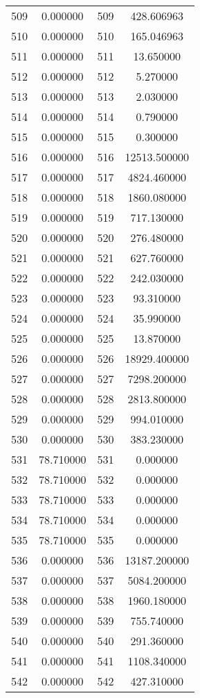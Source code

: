 \documentclass[12pt]{article}
\begin{document}
\begin{longtable}{@{}cccc@{}}
509 & 0.000000 & 509 & 428.606963 \\
510 & 0.000000 & 510 & 165.046963 \\
511 & 0.000000 & 511 & 13.650000 \\
512 & 0.000000 & 512 & 5.270000 \\
513 & 0.000000 & 513 & 2.030000 \\
514 & 0.000000 & 514 & 0.790000 \\
515 & 0.000000 & 515 & 0.300000 \\
516 & 0.000000 & 516 & 12513.500000 \\
517 & 0.000000 & 517 & 4824.460000 \\
518 & 0.000000 & 518 & 1860.080000 \\
519 & 0.000000 & 519 & 717.130000 \\
520 & 0.000000 & 520 & 276.480000 \\
521 & 0.000000 & 521 & 627.760000 \\
522 & 0.000000 & 522 & 242.030000 \\
523 & 0.000000 & 523 & 93.310000 \\
524 & 0.000000 & 524 & 35.990000 \\
525 & 0.000000 & 525 & 13.870000 \\
526 & 0.000000 & 526 & 18929.400000 \\
527 & 0.000000 & 527 & 7298.200000 \\
528 & 0.000000 & 528 & 2813.800000 \\
529 & 0.000000 & 529 & 994.010000 \\
530 & 0.000000 & 530 & 383.230000 \\
531 & 78.710000 & 531 & 0.000000 \\
532 & 78.710000 & 532 & 0.000000 \\
533 & 78.710000 & 533 & 0.000000 \\
534 & 78.710000 & 534 & 0.000000 \\
535 & 78.710000 & 535 & 0.000000 \\
536 & 0.000000 & 536 & 13187.200000 \\
537 & 0.000000 & 537 & 5084.200000 \\
538 & 0.000000 & 538 & 1960.180000 \\
539 & 0.000000 & 539 & 755.740000 \\
540 & 0.000000 & 540 & 291.360000 \\
541 & 0.000000 & 541 & 1108.340000 \\
542 & 0.000000 & 542 & 427.310000 \\

\end{longtable}
\end{document}
